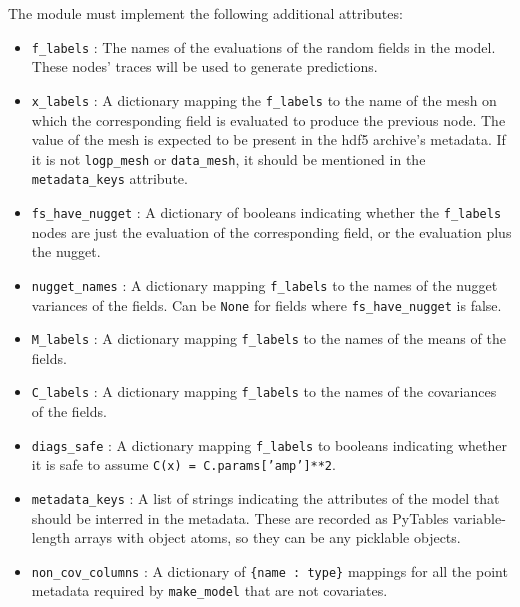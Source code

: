 The module must implement the following additional attributes:
\begin{itemize}
\item {} 
\texttt{f{\_}labels} : The names of the evaluations of the random fields in the model. These nodes'
traces will be used to generate predictions.

\item {} 
\texttt{x{\_}labels} : A dictionary mapping the \texttt{f{\_}labels} to the name of the mesh on which
the corresponding field is evaluated to produce the previous node. The value of the
mesh is expected to be present in the hdf5 archive's metadata. If it is not \texttt{logp{\_}mesh}
or \texttt{data{\_}mesh}, it should be mentioned in the \texttt{metadata{\_}keys} attribute.

\item {} 
\texttt{fs{\_}have{\_}nugget} : A dictionary of booleans indicating whether the \texttt{f{\_}labels} nodes are
just the evaluation of the corresponding field, or the evaluation plus the nugget.

\item {} 
\texttt{nugget{\_}names} : A dictionary mapping \texttt{f{\_}labels} to the names of the nugget variances of
the fields. Can be \texttt{None} for fields where \texttt{fs{\_}have{\_}nugget} is false.

\item {} 
\texttt{M{\_}labels} : A dictionary mapping \texttt{f{\_}labels} to the names of the means of the fields.

\item {} 
\texttt{C{\_}labels} : A dictionary mapping \texttt{f{\_}labels} to the names of the covariances of the
fields.

\item {} 
\texttt{diags{\_}safe} : A dictionary mapping \texttt{f{\_}labels} to booleans indicating whether it is safe
to assume \texttt{C(x) = C.params{[}'amp'{]}**2}.

\item {} 
\texttt{metadata{\_}keys} : A list of strings indicating the attributes of the model that should be
interred in the metadata. These are recorded as PyTables variable-length arrays with object
atoms, so they can be any picklable objects.

\item {} 
\texttt{non{\_}cov{\_}columns} : A dictionary of \texttt{{\{}name : type{\}}} mappings for all the point metadata
required by \texttt{make{\_}model} that are not covariates.


\end{itemize}
